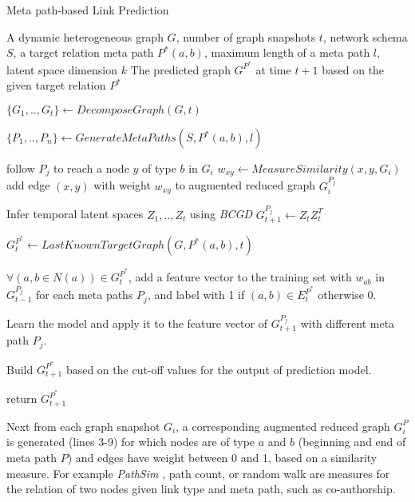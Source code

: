 \begin{algorithm}[t]
\caption{Meta path-based Link Prediction}\label{alg2}
\begin{algorithmic}[1]
\REQUIRE A dynamic heterogeneous graph $G$, number of graph snapshots $t$, network schema $S$, a target relation meta path $P^*(a,b)$, maximum length of a meta path $l$, latent space dimension $k$
\ENSURE The predicted graph $G^{P^*}$ at time $t+1$ based on the given target relation $P^*$

\STATE $\{G_1, .., G_t\} \leftarrow DecomposeGraph(G, t)$

\STATE $\{P_1, .., P_n\} \leftarrow GenerateMetaPaths(S, P^*(a,b), l)$


    
        \STATE follow $P_j$ to reach a node $y$ of type $b$ in $G_i$ 
        \STATE $w_{xy} \leftarrow MeasureSimilarity(x,y, G_i)$
        \STATE add edge $(x,y)$ with weight $w_{xy}$ to augmented reduced graph $G_i^{P_j}$ 
\ENDFOR

\ENDFOR

\STATE Infer temporal latent spaces $Z_1, .., Z_t$ using \textit{BCGD}%
\STATE $G^{P_j}_{t+1} \leftarrow Z_tZ^T_t$ 

\ENDFOR

\STATE $G^{P^*}_{t} \leftarrow LastKnownTargetGraph(G, P^*(a,b), t)$


\STATE $\forall (a,b\in N(a)) \in G^{P^*}_{t}$, add a feature vector to the training set with $w_{ab}$ in $G^{P_j}_{t-1}$ for each meta paths $P_j$, and label with 1 if $(a,b) \in E^{P^*}_{t}$ otherwise 0.

\STATE Learn the model and apply it to the feature vector of $G^{P_j}_{t+1}$ with different meta path $P_j$.

\STATE Build $G^{P^*}_{t+1}$ based on the cut-off values for the output of prediction model.

\STATE return $G^{P^*}_{t+1}$
\end{algorithmic}
\end{algorithm}


 Next from each graph snapshot $G_i$, a corresponding augmented reduced graph $G^P_i$ is generated (lines 3-9) for which nodes are of type $a$ and $b$ (beginning and end of meta path $P$) and edges have weight between 0 and 1, based on a similarity measure. For example \textit{PathSim} \cite{sun2011pathsim}, path count, or random walk are measures for the relation of two nodes given link type and meta path, such as co-authorship.

